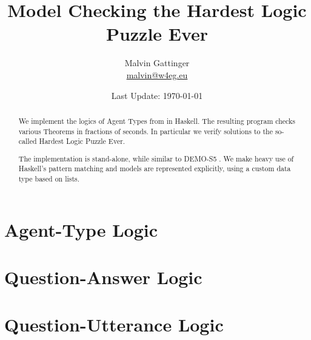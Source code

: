 \documentclass[12pt,a4paper]{article}
\title{Model Checking the Hardest Logic Puzzle Ever}
\author{Malvin Gattinger \\ \href{mailto:malvin@w4eg.eu}{malvin@w4eg.eu}}
\date{Last Update: \today}
\begin{document}
\maketitle

\begin{abstract}
We implement the logics of Agent Types from \cite{liuWang2013:agentTypesHLPE} in Haskell.
The resulting program checks various Theorems in fractions of seconds.
In particular we verify solutions to the so-called Hardest Logic Puzzle Ever.

The implementation is stand-alone, while similar to DEMO-S5 \cite{JvE:DEMO}.
We make heavy use of Haskell's pattern matching and models are represented explicitly, using a custom data type based on lists.
\end{abstract}

\vfill

\tableofcontents

\section{Agent-Type Logic}


\section{Question-Answer Logic}


\section{Question-Utterance Logic}




\end{document}
